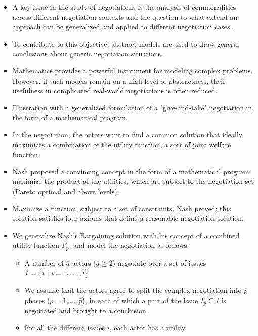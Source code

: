 \begin{itemize}
    \item A key issue in the study of negotiations is the analysis of
        commonalities across different negotiation contexts and the
        question to what extend an approach can be generalized and
        applied to different negotiation cases.
    \item To contribute to this objective, abstract models are used to
        draw general conclusions about generic negotiation situations.
    \item Mathematics provides a powerful instrument for modeling complex
        problems. However, if such models remain on a high level of abstractness,
        their usefulness in complicated real-world negotiations is often reduced.
    \item Illustration with a generalized formulation of a "give-and-take"
        negotiation in the form of a mathematical program.
    \item In the negotiation, the actors want to find a common solution
        that ideally maximizes a combination of the utility function, a sort of
        joint welfare function.
    \item Nash proposed a convincing concept in the form of a mathematical
        program: maximize the product of the utilities, which are subject to
        the negotiation set (Pareto optimal and above levels).
    \item Maximize a function, subject to a set of constraints. Nash proved:
        this solution satisfies four axioms that define a reasonable
        negotiation solution.
    \item We generalize Nash's Bargaining solution with his concept of a
        combined utility function $F_p$, and model the negotiation as
        follows:
        \begin{itemize}
            \item A number of $\overline{a}$ actors ($\overline{a} \geq 2$)
                negotiate over a set of issues $I=\geschwungeneklammer{i \ | \ i=1,\dots,\overline{i}}$
            \item We assume that the actors agree to split the complex negotiation
                into $\overline{p}$ phases ($p = 1,\dots,\overline{p}$), in each of
                which a part of the issue $I_p \subseteq I$ is negotiated and brought
                to a conclusion.
            \item For all the different issues $i$, each actor has a utility

\end{itemize}
\end{itemize}
